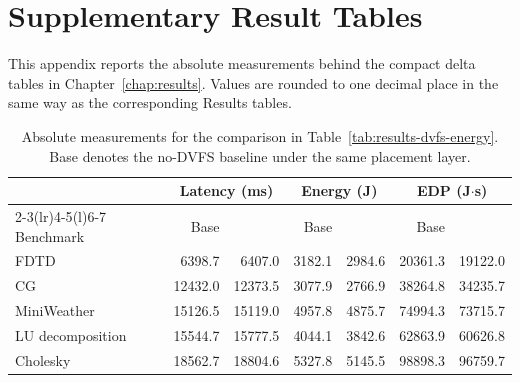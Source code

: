 \chapter{Supplementary Result Tables}
\label{app:supplementary-results}

This appendix reports the absolute measurements behind the compact delta tables
in Chapter~\ref{chap:results}. Values are rounded to one decimal place in the
same way as the corresponding Results tables.

\begin{table}[!htbp]
\centering
\begingroup
\scriptsize
\setlength{\tabcolsep}{3pt}
\begin{tabular}{@{}lrrrrrr@{}}
\toprule
& \multicolumn{2}{c}{Latency (ms)}
& \multicolumn{2}{c}{Energy (J)}
& \multicolumn{2}{c}{EDP (J\(\cdot\)s)} \\
\cmidrule(lr){2-3}\cmidrule(lr){4-5}\cmidrule(l){6-7}
Benchmark
& Base & \WinDVFS{}
& Base & \WinDVFS{}
& Base & \WinDVFS{} \\
\midrule
FDTD & 6398.7 & 6407.0 & 3182.1 & 2984.6 & 20361.3 & 19122.0 \\
CG & 12432.0 & 12373.5 & 3077.9 & 2766.9 & 38264.8 & 34235.7 \\
MiniWeather & 15126.5 & 15119.0 & 4957.8 & 4875.7 & 74994.3 & 73715.7 \\
LU decomposition & 15544.7 & 15777.5 & 4044.1 & 3842.6 & 62863.9 & 60626.8 \\
Cholesky & 18562.7 & 18804.6 & 5327.8 & 5145.5 & 98898.3 & 96759.7 \\
\bottomrule
\end{tabular}
\endgroup
\caption{Absolute measurements for the \WinDVFS{} comparison in Table~\ref{tab:results-dvfs-energy}. Base denotes the no-DVFS baseline under the same placement layer.}
\label{tab:appendix-dvfs-absolute}
\end{table}


